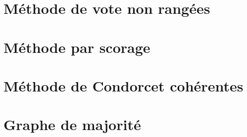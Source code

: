 
\section{Méthode de vote non rangées}


\section{Méthode par scorage}


\section{Méthode de Condorcet cohérentes}


\section{Graphe de majorité}


\pagebreak